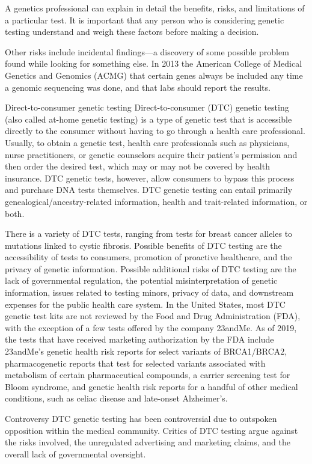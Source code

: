 A genetics professional can explain in detail the benefits, risks, and limitations of a particular test. It is important that any person who is considering genetic testing understand and weigh these factors before making a decision.

Other risks include incidental findings---a discovery of some possible problem found while looking for something else. In 2013 the American College of Medical Genetics and Genomics (ACMG) that certain genes always be included any time a genomic sequencing was done, and that labs should report the results.

Direct-to-consumer genetic testing
Direct-to-consumer (DTC) genetic testing (also called at-home genetic testing) is a type of genetic test that is accessible directly to the consumer without having to go through a health care professional. Usually, to obtain a genetic test, health care professionals such as physicians, nurse practitioners, or genetic counselors acquire their patient's permission and then order the desired test, which may or may not be covered by health insurance. DTC genetic tests, however, allow consumers to bypass this process and purchase DNA tests themselves. DTC genetic testing can entail primarily genealogical/ancestry-related information, health and trait-related information, or both.

There is a variety of DTC tests, ranging from tests for breast cancer alleles to mutations linked to cystic fibrosis. Possible benefits of DTC testing are the accessibility of tests to consumers, promotion of proactive healthcare, and the privacy of genetic information. Possible additional risks of DTC testing are the lack of governmental regulation, the potential misinterpretation of genetic information, issues related to testing minors, privacy of data, and downstream expenses for the public health care system. In the United States, most DTC genetic test kits are not reviewed by the Food and Drug Administration (FDA), with the exception of a few tests offered by the company 23andMe. As of 2019, the tests that have received marketing authorization by the FDA include 23andMe's genetic health risk reports for select variants of BRCA1/BRCA2, pharmacogenetic reports that test for selected variants associated with metabolism of certain pharmaceutical compounds, a carrier screening test for Bloom syndrome, and genetic health risk reports for a handful of other medical conditions, such as celiac disease and late-onset Alzheimer's.

Controversy
DTC genetic testing has been controversial due to outspoken opposition within the medical community. Critics of DTC testing argue against the risks involved, the unregulated advertising and marketing claims, and the overall lack of governmental oversight.

